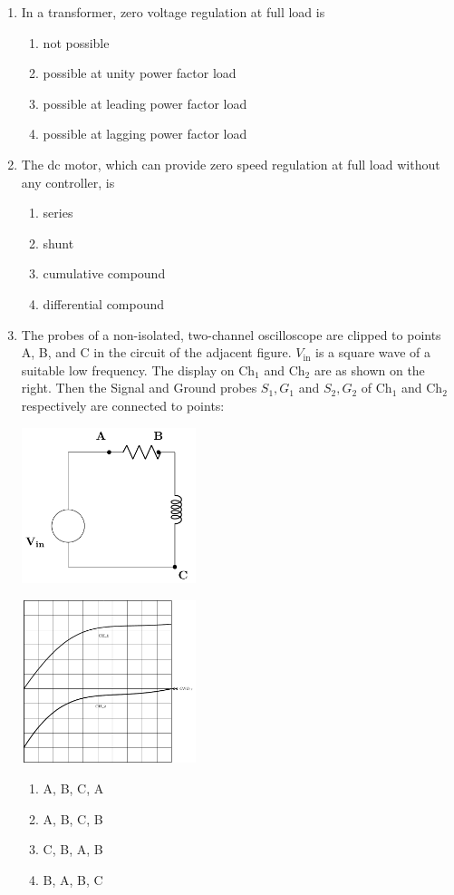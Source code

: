 \documentclass[journal,12pt,onecolumn]{IEEEtran}
\theoremstyle{remark}
\begin{document}
\begin{enumerate}
    \item In a transformer, zero voltage regulation at full load is 
    \begin{enumerate}
\item not possible 
\item possible at unity power factor load 
\item possible at leading power factor load 
\item possible at lagging power factor load\\
\end{enumerate}
\item The dc motor, which can provide zero speed regulation at full load without any
controller, is 
\begin{enumerate} \item series \item shunt \item cumulative compound \item differential compound\\
\end{enumerate}
\item  The probes of a non-isolated, two-channel oscilloscope are clipped to points A, B, and C in the circuit of the adjacent figure. $V_{\text{in}}$ is a square wave of a suitable low frequency. The display on $\text{Ch}_1 $ and $\text{Ch}_2$ are as shown on the right. Then the Signal and Ground probes $ S_1, G_1 $ and $ S_2, G_2 $ of $ \text{Ch}_1 $ and $ \text{Ch}_2 $respectively are connected to points: 
		 \begin{center}


\includegraphics[width=0.4\textwidth]{figs/fig9/fig9.1/main} 
\end{center}
	 \begin{center}

\includegraphics[width=0.4\textwidth]{figs/fig9/9.2/main} 
\end{center}


\begin{enumerate}
    \item A, B, C, A
    \item A, B, C, B
    \item C, B, A, B
    \item B, A, B, C
\end{enumerate}
\end{enumerate}
\end{document}
